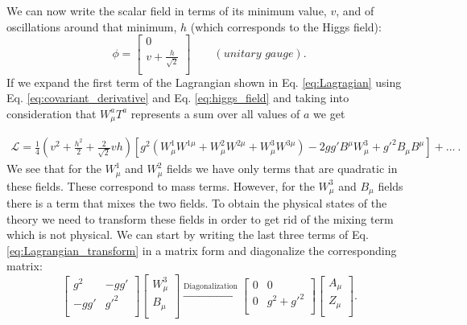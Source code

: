 We can now write the scalar field in terms of its minimum value, $v$, and of oscillations around that minimum, $h$ (which corresponds to the Higgs field):
\begin{equation}
\phi = \begin{bmatrix}
0 \\
v+\frac{h}{\sqrt{2}} \\
\end{bmatrix} \qquad (\textit{unitary gauge}).
\label{eq:higgs_field}
\end{equation}
If we expand the first term of the Lagrangian shown in Eq. \ref{eq:Lagragian} using Eq. \ref{eq:covariant_derivative} and Eq. \ref{eq:higgs_field} and taking into consideration that $W^a_{\mu}T^a$ represents a sum over all values of $a$ we get

\begin{align}
	\mathcal{L} = \frac{1}{4}\left(v^2+\frac{h^2}{2}+\frac{2}{\sqrt{2}}vh\right) \left[g^2\left(W^1_{\mu}W^{1\mu}+W^2_{\mu}W^{2\mu}+W^3_{\mu}W^{3\mu}\right)-2gg'B^{\mu}W^3_{\mu}+g'^2 B_{\mu}B^{\mu}\right] + ...~.
	\label{eq:Lagrangian_transform}
\end{align}
We see that for the $W^1_{\mu}$ and $W^2_{\mu}$ fields we have only terms that are quadratic in these fields. These correspond to mass terms. However, for the $W^3_{\mu}$ and $B_{\mu}$ fields there is a term that mixes the two fields. To obtain the physical states of the theory we need to transform these fields in order to get rid of the mixing term which is not physical. We can start by writing the last three terms of Eq. \ref{eq:Lagrangian_transform} in a matrix form and diagonalize the corresponding matrix:
\begin{equation}
\begin{bmatrix}
g^2 & -gg' \\
-gg' & g'^2 \\
\end{bmatrix}
\begin{bmatrix}
W^3_{\mu} \\
B_{\mu} \\
\end{bmatrix}
\xrightarrow{\text{Diagonalization}}
\begin{bmatrix}
0 & 0 \\
0 & g^2+g'^2 \\
\end{bmatrix}
\begin{bmatrix}
A_{\mu} \\
Z_{\mu} \\
\end{bmatrix}.
\label{eq:gauge_matrix}
\end{equation}

